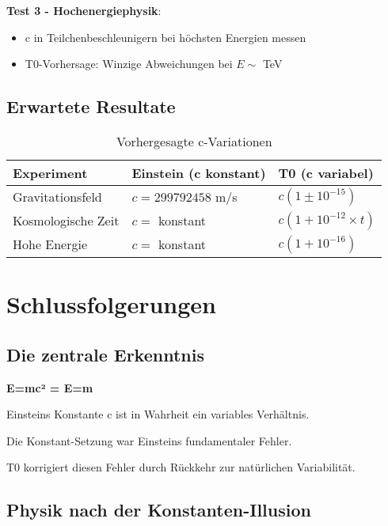 \documentclass[12pt,a4paper]{article}
\begin{document}
	\textbf{Test 3 - Hochenergiephysik}:
	\begin{itemize}
		\item c in Teilchenbeschleunigern bei höchsten Energien messen
		\item T0-Vorhersage: Winzige Abweichungen bei $E \sim$ TeV
	\end{itemize}
	
	\subsection{Erwartete Resultate}
	
	\begin{table}[htbp]
		\centering
		\small
		\begin{tabular}{|p{3cm}|p{4cm}|p{4cm}|}
			\hline
			\textbf{Experiment} & \textbf{Einstein (c konstant)} & \textbf{T0 (c variabel)} \\
			\hline
			Gravitationsfeld & $c = 299792458$ m/s & $c(1 \pm 10^{-15})$ \\
			\hline
			Kosmologische Zeit & $c = $ konstant & $c(1 + 10^{-12} \times t)$ \\
			\hline
			Hohe Energie & $c = $ konstant & $c(1 + 10^{-16})$ \\
			\hline
		\end{tabular}
		\caption{Vorhergesagte c-Variationen}
	\end{table}
	
	\section{Schlussfolgerungen}
	
	\subsection{Die zentrale Erkenntnis}
	
	\begin{tcolorbox}[colback=green!5!white,colframe=green!75!black,title=Die fundamentale Wahrheit]
		\textbf{E=mc² = E=m}
		
		Einsteins Konstante c ist in Wahrheit ein variables Verhältnis.
		
		Die Konstant-Setzung war Einsteins fundamentaler Fehler.
		
		T0 korrigiert diesen Fehler durch Rückkehr zur natürlichen Variabilität.
	\end{tcolorbox}
	
	\subsection{Physik nach der Konstanten-Illusion}
	
\end{document}
